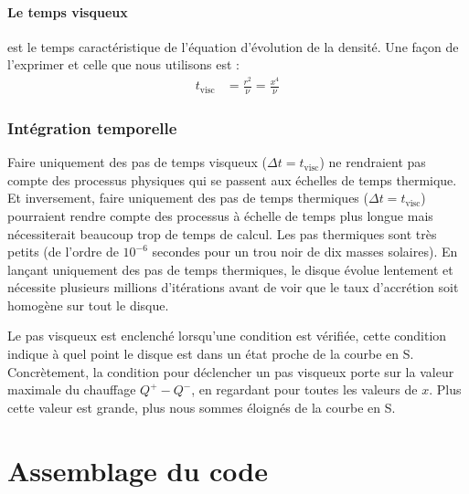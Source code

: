 \documentclass[a4paper,12pt]{article}
\begin{document}
 \paragraph{Le temps visqueux} est le temps caractéristique de l'équation d'évolution de la densité. Une façon de l'exprimer et celle que nous utilisons est :
 \begin{align}
 t_\text{visc} &= \frac{r^2}{\nu} = \frac{x^4}{\nu}
 \end{align}
 
 \subsubsection{Intégration temporelle}
Faire uniquement des pas de temps visqueux ($\Delta t = t_\text{visc}$) ne rendraient pas compte des processus physiques qui se passent aux échelles de temps thermique. Et inversement, faire uniquement des pas de temps thermiques ($\Delta t = t_\text{visc}$) pourraient rendre compte des processus à échelle de temps plus longue mais nécessiterait beaucoup trop de temps de calcul.
Les pas thermiques sont très petits (de l'ordre de $10^{-6}$ secondes pour un trou noir de dix masses solaires). En lançant uniquement des pas de temps thermiques, le disque évolue lentement et nécessite plusieurs millions d'itérations avant de voir que le taux d'accrétion soit homogène sur tout le disque. 

 Le pas visqueux est enclenché lorsqu'une condition est vérifiée, cette condition indique à quel point le disque est dans un état proche de la courbe en S.
Concrètement, la condition pour déclencher un pas visqueux porte sur la valeur maximale du chauffage $Q^+-Q^-$, en regardant pour toutes les valeurs de $x$. Plus cette valeur est grande, plus nous sommes éloignés de la courbe en S.

\section{Assemblage du code}
\end{document}
